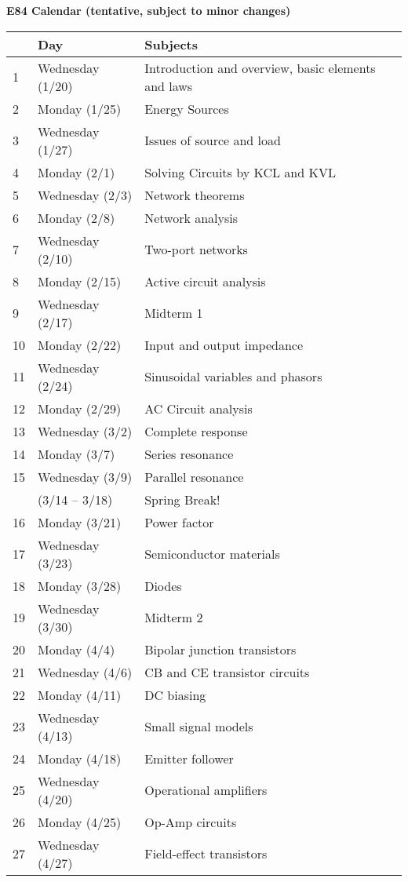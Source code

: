 \usepackage{html}
\textwidth 6.0in
\topmargin -0.5in
\oddsidemargin -0in
\evensidemargin -0.5in


{\bf \large E84 Calendar (tentative, subject to minor changes)}

\begin{tabular}{l|l|l}\hline
  & {\bf Day} & {\bf Subjects} \\ \hline
1 & Wednesday (1/20) & Introduction and overview, basic elements and laws \\
2 & Monday (1/25) & Energy Sources \\
3 & Wednesday (1/27) & Issues of source and load \\
4 & Monday (2/1) & Solving Circuits by KCL and KVL \\
5 & Wednesday (2/3) & Network theorems \\
6 & Monday (2/8) & Network analysis \\
7 & Wednesday (2/10) & Two-port networks  \\
8 & Monday (2/15) & Active circuit analysis \\
9 & Wednesday (2/17) & Midterm 1 \\
10& Monday (2/22) & Input and output impedance \\
11& Wednesday (2/24) & Sinusoidal variables and phasors \\
12& Monday (2/29) & AC Circuit analysis  \\
13& Wednesday (3/2) & Complete response \\
14& Monday (3/7) & Series resonance \\
15& Wednesday (3/9) & Parallel resonance \\
  & (3/14 -- 3/18) & Spring Break! \\
16& Monday (3/21) & Power factor \\
17& Wednesday (3/23) & Semiconductor materials \\
18& Monday (3/28) & Diodes \\
19& Wednesday (3/30) & Midterm 2 \\
20& Monday (4/4) & Bipolar junction transistors \\ 
21& Wednesday (4/6) & CB and CE transistor circuits \\
22& Monday (4/11) & DC biasing \\ 
23& Wednesday (4/13) & Small signal models \\  
24& Monday (4/18) & Emitter follower \\
25& Wednesday (4/20) & Operational amplifiers \\
26& Monday (4/25) & Op-Amp circuits \\
27& Wednesday (4/27) & Field-effect transistors \\
\end{tabular}




